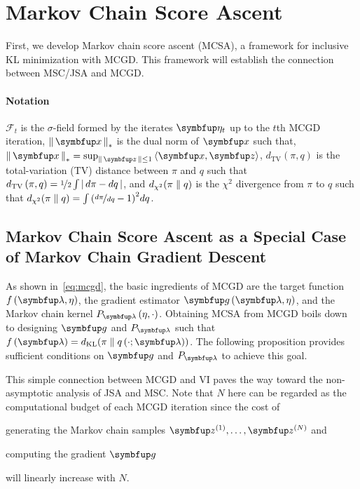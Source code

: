 
\vspace{-1.5ex}
\section{Markov Chain Score Ascent}\label{section:mcsa}
\vspace{-1.0ex}

First, we develop Markov chain score ascent (MCSA), a framework for inclusive KL minimization with MCGD.
This framework will establish the connection between MSC/JSA and MCGD.

\vspace{-1.5ex}
{
\paragraph{Notation}
\(\mathcal{F}_t\) is the \(\sigma\)-field formed by the iterates \(\veta_t\) up to the \(t\)th MCGD iteration, \(\norm{\vx}_* \) is the dual norm of \(\vx\) such that, \(\norm{\vx}_* = \sup_{\norm{\vz} \leq 1} \iprod{\vx}{\vz}\), \(d_{\text{TV}}\left(\pi, q\right)\) is the total-variation (TV) distance between \(\pi\) and \(q\) such that \(d_{\text{TV}}\left(\pi, q\right) = \nicefrac{1}{2} \int {\left|\,d\pi - dq\,\right|} \), and \(d_{\chi^2}(\pi\parallel q)\) is the \(\chi^2\) divergence from \(\pi\) to \(q\) such that \(d_{\chi^2}(\pi\parallel q) = \int {\left(\nicefrac{d\pi}{dq} - 1\right)}^2 dq\).
}

\vspace{-1.5ex}
\subsection{Markov Chain Score Ascent as a Special Case of Markov Chain Gradient Descent}\label{section:convergence}
\vspace{-1.5ex}
As shown in~\cref{eq:mcgd}, the basic ingredients of MCGD are the target function \(f\left(\vlambda, \eta\right)\), the gradient estimator \(\vg\left(\vlambda, \eta\right)\), and the Markov chain kernel \(P_{\vlambda}\left(\eta, \cdot\right)\).
Obtaining MCSA from MCGD boils down to designing \(\vg\) and \(P_{\vlambda}\) such that \(f\left(\vlambda\right) = \DKL{\pi}{q\left(\cdot; \vlambda\right)} \).
The following proposition provides sufficient conditions on \(\vg\) and \(P_{\vlambda}\) to achieve this goal.

\vspace{0.07in}


This simple connection between MCGD and VI paves the way toward the non-asymptotic analysis of JSA and MSC.
Note that \(N\) here can be regarded as the computational budget of each MCGD iteration since the cost of
\begin{enumerate*}[label=\textbf{(\roman*)}]
  \item generating the Markov chain samples \(\vz^{(1)}, \ldots, \vz^{(N)}\) and
  \item computing the gradient \(\vg\)
\end{enumerate*}
will linearly increase with \(N\).

